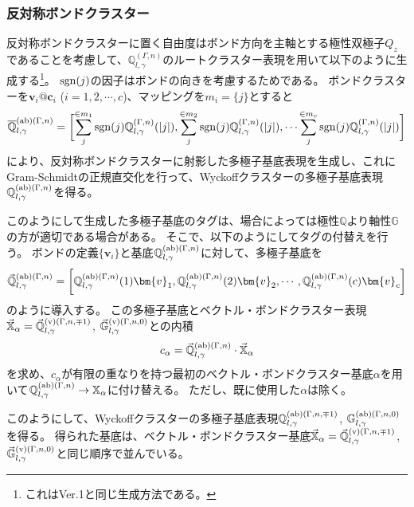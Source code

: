 \documentclass[11pt]{easymemo}
\begin{document}
\subsubsection{反対称ボンドクラスター}

反対称ボンドクラスターに置く自由度はボンド方向を主軸とする極性双極子$Q_{z}$であることを考慮して、$\mathbb{Q}_{l,\gamma}^{(\Gamma,n)}$のルートクラスター表現を用いて以下のように生成する\footnote{これはVer.1と同じ生成方法である。}。
${\rm sgn}(j)$の因子はボンドの向きを考慮するためである。
ボンドクラスターを$\bm{v}_{i}@\bm{c}_{i}$ ($i=1,2,\cdots,c$)、マッピングを$m_{i}=\{j\}$とすると
\begin{align}
\overline{\mathbb{Q}}_{l,\gamma}^{{\rm (ab)}(\Gamma,n)}=\biggl[
\sum_{j}^{\in m_{1}}{\rm sgn}(j)\mathbb{Q}_{l,\gamma}^{(\Gamma,n)}(|j|),
\sum_{j}^{\in m_{2}}{\rm sgn}(j)\mathbb{Q}_{l,\gamma}^{(\Gamma,n)}(|j|),
\cdots
\sum_{j}^{\in m_{c}}{\rm sgn}(j)\mathbb{Q}_{l,\gamma}^{(\Gamma,n)}(|j|)
\biggr]
\end{align}
により、反対称ボンドクラスターに射影した多極子基底表現を生成し、これにGram-Schmidtの正規直交化を行って、Wyckoffクラスターの多極子基底表現$\mathbb{Q}_{l,\gamma}^{{\rm (ab)}(\Gamma,n)}$を得る。

このようにして生成した多極子基底のタグは、場合によっては極性$\mathbb{Q}$より軸性$\mathbb{G}$の方が適切である場合がある。
そこで、以下のようにしてタグの付替えを行う。
ボンドの定義$\{\bm{v}_i\}$と基底$\mathbb{Q}_{l,\gamma}^{{\rm (ab)}(\Gamma,n)}$に対して、多極子基底を
\begin{align}
\vec{\mathbb{Q}}_{l,\gamma}^{{\rm (ab)}(\Gamma,n)}=\biggl[
\mathbb{Q}_{l,\gamma}^{{\rm (ab)}(\Gamma,n)}(1)\bm{v}_1,
\mathbb{Q}_{l,\gamma}^{{\rm (ab)}(\Gamma,n)}(2)\bm{v}_2,
\cdots,
\mathbb{Q}_{l,\gamma}^{{\rm (ab)}(\Gamma,n)}(c)\bm{v}_c
\biggr]
\end{align}
のように導入する。
この多極子基底とベクトル・ボンドクラスター表現$\vec{\mathbb{X}}_\alpha=\vec{\mathbb{Q}}_{l,\gamma}^{{\rm (v)}(\Gamma,n,\mp1)}$, $\vec{\mathbb{G}}_{l,\gamma}^{{\rm (v)}(\Gamma,n,0)}$との内積
\begin{align}
c_\alpha =\vec{\mathbb{Q}}_{l,\gamma}^{{\rm (ab)}(\Gamma,n)}\cdot\vec{\mathbb{X}}_\alpha
\end{align}
を求め、$c_\alpha$が有限の重なりを持つ最初のベクトル・ボンドクラスター基底$\alpha$を用いて$\mathbb{Q}_{l,\gamma}^{{\rm (ab)}(\Gamma,n)}\to \mathbb{X}_\alpha$に付け替える。
ただし、既に使用した$\alpha$は除く。

このようにして、Wyckoffクラスターの多極子基底表現$\mathbb{Q}_{l,\gamma}^{{\rm (ab)}(\Gamma,n,\mp1)}$, $\mathbb{G}_{l,\gamma}^{{\rm (ab)}(\Gamma,n,0)}$を得る。
得られた基底は、ベクトル・ボンドクラスター基底$\vec{\mathbb{X}}_\alpha=\vec{\mathbb{Q}}_{l,\gamma}^{{\rm (v)}(\Gamma,n,\mp1)}$, $\vec{\mathbb{G}}_{l,\gamma}^{{\rm (v)}(\Gamma,n,0)}$と同じ順序で並んでいる。
\end{document}
